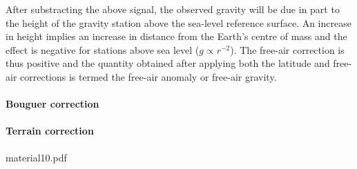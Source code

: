 After substracting the above signal, the observed gravity will
be due in part to the height of the gravity station above the sea-level reference
surface.
An increase in height implies an increase in distance from the Earth’s
centre of mass and the effect is negative for stations above sea level ($g \propto r^{-2}$).
The free-air correction is thus positive and 
the quantity obtained after applying both the latitude and
free-air corrections is termed the free-air anomaly or free-air gravity.


\paragraph{Bouguer correction}



\paragraph{Terrain correction}


material10.pdf
